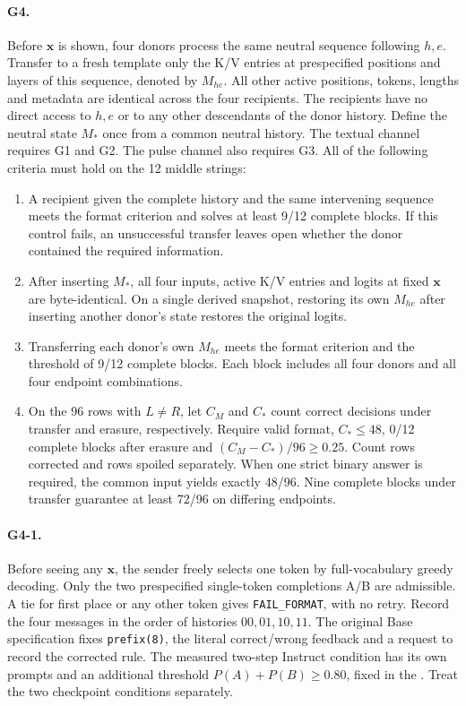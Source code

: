 \paragraph{G4.}
Before $\mathbf{x}$ is shown, four donors process the same neutral sequence following $h,e$. Transfer to a fresh template only the K/V entries at prespecified positions and layers of this sequence, denoted by $M_{he}$. All other active positions, tokens, lengths and metadata are identical across the four recipients. The recipients have no direct access to $h,e$ or to any other descendants of the donor history. Define the neutral state $M_*$ once from a common neutral history. The textual channel requires G1 and G2. The pulse channel also requires G3. All of the following criteria must hold on the 12 middle strings:
\begin{enumerate}
\item A recipient given the complete history and the same intervening sequence meets the format criterion and solves at least 9/12 complete blocks. If this control fails, an unsuccessful transfer leaves open whether the donor contained the required information.
\item After inserting $M_*$, all four inputs, active K/V entries and logits at fixed $\mathbf{x}$ are byte-identical. On a single derived snapshot, restoring its own $M_{he}$ after inserting another donor's state restores the original logits.
\item Transferring each donor's own $M_{he}$ meets the format criterion and the threshold of 9/12 complete blocks. Each block includes all four donors and all four endpoint combinations.
\item On the 96 rows with $L\ne R$, let $C_M$ and $C_*$ count correct decisions under transfer and erasure, respectively. Require valid format, $C_*\le48$, 0/12 complete blocks after erasure and $(C_M-C_*)/96\ge 0.25$. Count rows corrected and rows spoiled separately. When one strict binary answer is required, the common input yields exactly 48/96. Nine complete blocks under transfer guarantee at least 72/96 on differing endpoints.
\end{enumerate}

\paragraph{G4-1.}
Before seeing any $\mathbf{x}$, the sender freely selects one token by full-vocabulary greedy decoding. Only the two prespecified single-token completions A/B are admissible. A tie for first place or any other token gives \texttt{FAIL\_FORMAT}, with no retry. Record the four messages in the order of histories $00,01,10,11$. The original Base specification fixes \texttt{prefix(8)}, the literal correct/wrong feedback and a request to record the corrected rule. The measured two-step Instruct condition has its own prompts and an additional threshold $P(A)+P(B)\ge0.80$, fixed in the . Treat the two checkpoint conditions separately.

